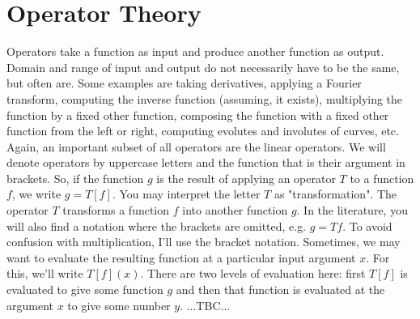 \section{Operator Theory}
Operators take a function as input and produce another function as output. Domain and range of input and output do not necessarily have to be the same, but often are. Some examples are taking derivatives, applying a Fourier transform, computing the inverse function (assuming, it exists), multiplying the function by a fixed other function, composing the function with a fixed other function from the left or right, computing evolutes and involutes of curves, etc. Again, an important subset of all operators are the linear operators. We will denote operators by uppercase letters and the function that is their argument in brackets. So, if the function $g$ is the result of applying an operator $T$ to a function $f$, we write $g = T[f]$. You may interpret the letter $T$ as "transformation". The operator $T$ transforms a function $f$ into another function $g$. In the literature, you will also find a notation where the brackets are omitted, e.g. $g = T f$. To avoid confusion with multiplication, I'll use the bracket notation. Sometimes, we may want to evaluate the resulting function at a particular input argument $x$. For this, we'll write $T[f](x)$. There are two levels of evaluation here: first $T[f]$ is evaluated to give some function $g$ and then that function is evaluated at the argument $x$ to give some number $y$. ...TBC...






